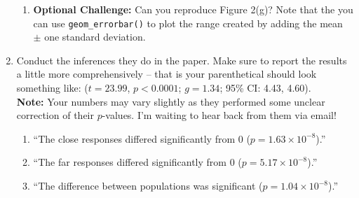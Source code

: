 \documentclass{article}\usepackage[]{graphicx}\usepackage[]{xcolor}
\begin{document}
\begin{enumerate}
\begin{enumerate}
  \item \textbf{Optional Challenge:} Can you reproduce Figure 2(g)?
  Note that the you can use \texttt{geom\_errorbar()} to plot
  the range created by adding the mean $\pm$ one standard deviation.
\end{enumerate}
\item Conduct the inferences they do in the paper. Make sure to report the results
a little more comprehensively -- that is your parenthetical should look something
like: ($t=23.99$, $p<0.0001$; $g=1.34$; 95\% CI: 4.43, 4.60).\\
\textbf{Note:} Your numbers may vary slightly as they performed some unclear
correction of their $p$-values. I'm waiting to hear back from them via email!
\begin{enumerate}
  \item ``The close responses differed significantly from 0 ($p=1.63 \times 10^{-8}$).''
  \item ``The far responses differed significantly from 0 ($p=5.17 \times 10^{-8}$).''
  \item ``The difference between populations was significant ($p=1.04 \times10^{-8}$).''
  

\end{enumerate}
\end{enumerate}
\end{document}
